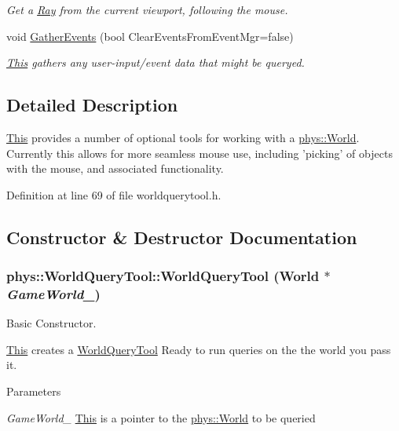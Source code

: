 \begin{DoxyCompactItemize}
\begin{DoxyCompactList}\small\item\em Get a \hyperlink{classphys_1_1Ray}{Ray} from the current viewport, following the mouse. \item\end{DoxyCompactList}\item 
void \hyperlink{classphys_1_1WorldQueryTool_ae387ff047f3cdf408d8959b8cbf4cc57}{GatherEvents} (bool ClearEventsFromEventMgr=false)
\begin{DoxyCompactList}\small\item\em \hyperlink{structThis}{This} gathers any user-\/input/event data that might be queryed. \item\end{DoxyCompactList}\end{DoxyCompactItemize}


\subsection{Detailed Description}
\hyperlink{structThis}{This} provides a number of optional tools for working with a \hyperlink{classphys_1_1World}{phys::World}. Currently this allows for more seamless mouse use, including 'picking' of objects with the mouse, and associated functionality. 

Definition at line 69 of file worldquerytool.h.



\subsection{Constructor \& Destructor Documentation}
\hypertarget{classphys_1_1WorldQueryTool_a6b156ab7ea6236402c40467da7f11c0d}{
\subsubsection[{WorldQueryTool}]{\setlength{\rightskip}{0pt plus 5cm}phys::WorldQueryTool::WorldQueryTool ({\bf World} $\ast$ {\em GameWorld\_\-})}}
\label{d8/d69/classphys_1_1WorldQueryTool_a6b156ab7ea6236402c40467da7f11c0d}


Basic Constructor. 

\hyperlink{structThis}{This} creates a \hyperlink{classphys_1_1WorldQueryTool}{WorldQueryTool} Ready to run queries on the the world you pass it. 
\begin{DoxyParams}{Parameters}
\item[{\em GameWorld\_\-}]\hyperlink{structThis}{This} is a pointer to the \hyperlink{classphys_1_1World}{phys::World} to be queried \end{DoxyParams}


